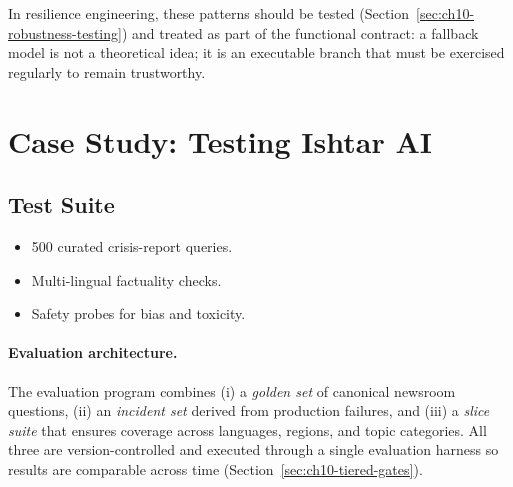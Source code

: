 In resilience engineering, these patterns should be tested (Section~\ref{sec:ch10-robustness-testing}) and treated as part of the functional contract:
a fallback model is not a theoretical idea; it is an executable branch that must be exercised regularly to remain trustworthy.

\section{Case Study: Testing Ishtar AI}
\label{sec:ch10-case-study-testing-ishtar-ai}
\subsection{Test Suite}
\begin{itemize}
    \item 500 curated crisis-report queries.
    \item Multi-lingual factuality checks.
    \item Safety probes for bias and toxicity.
\end{itemize}

\paragraph{Evaluation architecture.}
The \ishtar{} evaluation program combines (i) a \emph{golden set} of canonical newsroom questions, (ii) an \emph{incident set} derived from production failures, and (iii) a \emph{slice suite} that ensures coverage across languages, regions, and topic categories.
All three are version-controlled and executed through a single evaluation harness so results are comparable across time (Section~\ref{sec:ch10-tiered-gates}).

